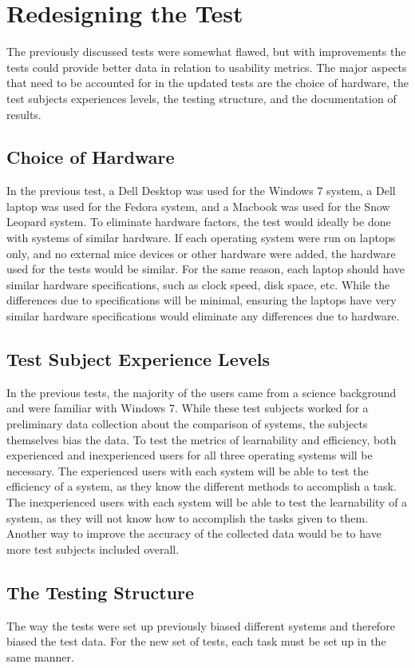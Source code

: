 \documentclass[11pt,letterpaper]{report}
\begin{document}
\chapter{Redesigning the Test}
The previously discussed tests were somewhat flawed, but with improvements the tests could provide better data in relation to usability metrics. The major aspects that need to be accounted for in the updated tests are the choice of hardware, the test subjects experiences levels, the testing structure, and the documentation of results.

\section{Choice of Hardware}
In the previous test, a Dell Desktop was used for the Windows 7 system, a Dell laptop was used for the Fedora system, and a Macbook was used for the Snow Leopard system. To eliminate hardware factors, the test would ideally be done with systems of similar hardware. If each operating system were run on laptops only, and no external mice devices or other hardware were added, the hardware used for the tests would be similar. For the same reason, each laptop should have similar hardware specifications, such as clock speed, disk space, etc. While the differences due to specifications will be minimal, ensuring the laptops have very similar hardware specifications would eliminate any differences due to hardware. 

\section{Test Subject Experience Levels}
In the previous tests, the majority of the users came from a science background and were familiar with Windows 7. While these test subjects worked for a preliminary data collection about the comparison of systems, the subjects themselves bias the data. To test the metrics of learnability and efficiency, both experienced and inexperienced users for all three operating systems will be necessary. The experienced users with each system will be able to test the efficiency of a system, as they know the different methods to accomplish a task. The inexperienced users with each system will be able to test the learnability of a system, as they will not know how to accomplish the tasks given to them. Another way to improve the accuracy of the collected data would be to have more test subjects included overall. 

\section{The Testing Structure}
The way the tests were set up previously biased different systems and therefore biased the test data. For the new set of tests, each task must be set up in the same manner. 
\end{document}

